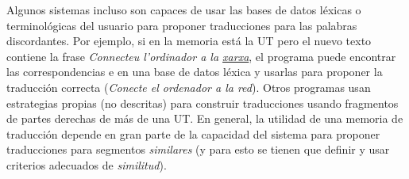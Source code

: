 Algunos sistemas incluso son capaces de usar las bases de datos léxicas o terminológicas del usuario para proponer traducciones para las palabras discordantes. Por ejemplo, si en la memoria está la UT  pero el nuevo texto contiene la frase \emph{Connecteu l'ordinador a la \underline{xarxa}}, el programa puede encontrar las correspondencias  e  en una base de datos léxica y usarlas para proponer la traducción correcta (\emph{Conecte el ordenador a la red}). Otros programas usan estrategias propias (no descritas) para construir traducciones usando fragmentos de partes derechas de más de una UT. En general, la utilidad de una memoria de traducción depende en gran parte de la capacidad del sistema para proponer traducciones para segmentos \emph{similares} (y para esto se tienen que definir y usar criterios adecuados de \emph{similitud}). 


